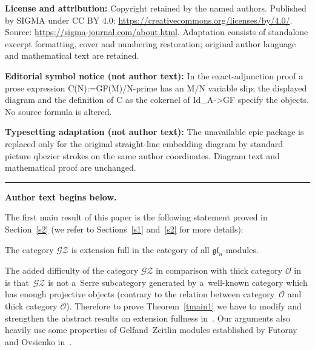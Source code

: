 \documentclass[11pt]{article}
\newenvironment{customthm}[1]{\renewcommand\theinnercustomthm{#1}\innercustomthm}{\endinnercustomthm}
\begin{document}
\noindent\textbf{License and attribution:} Copyright retained by the named authors. Published by SIGMA under CC BY 4.0: \url{https://creativecommons.org/licenses/by/4.0/}. Source: \url{https://sigma-journal.com/about.html}. Adaptation consists of standalone excerpt formatting, cover and numbering restoration; original author language and mathematical text are retained.\par
\noindent\textbf{Editorial symbol notice (not author text):} In the exact-adjunction proof a prose expression C(N):=\allowbreak{}GF(M)/N-prime has an M/N variable slip; the displayed diagram and the definition of C as the cokernel of Id\_A->GF specify the objects. No source formula is altered.\par
\noindent\textbf{Typesetting adaptation (not author text):} The unavailable epic package is replaced only for the original straight-line embedding diagram by standard picture qbezier strokes on the same author coordinates. Diagram text and mathematical proof are unchanged.\par
\medskip\hrule\medskip\noindent\textbf{Author text begins below.}\par
\setcounter{section}{1}
\setcounter{subsection}{0}
\setcounter{subsubsection}{0}
\setcounter{innercustomthm}{0}
\setcounter{equation}{0}
The f\/irst main result of this paper is the following statement proved in Section~\ref{s2} (we refer to Sections~\ref{s1}
and~\ref{s2} for more details):

\begin{customthm}{A}
\label{tmain1}
The category $\mathscr{G}\mathscr{Z}$ is extension full in the category of all $\mathfrak{gl}_n$-modules.
\end{customthm}

The added dif\/f\/iculty of the category $\mathscr{G}\mathscr{Z}$ in comparison with thick category $\mathcal{O}$
in~\cite{CoMa} is that~$\mathscr{G}\mathscr{Z}$ is not a~Serre subcategory generated by a~well-known category which has
enough projective objects (contrary to the relation between category~$\mathcal{O}$ and thick category $\mathcal{O}$).
Therefore to prove Theorem~\ref{tmain1} we have to modify and strengthen the abstract results on extension fullness
in~\cite{CoMa}.
Our arguments also heavily use some properties of Gelfand--Zeitlin modules established by Futorny and Ovsienko
in~\cite{FuOv2}.
\setcounter{section}{1}
\setcounter{subsection}{0}
\setcounter{subsubsection}{0}
\setcounter{innercustomthm}{0}
\setcounter{equation}{0}
\end{document}
